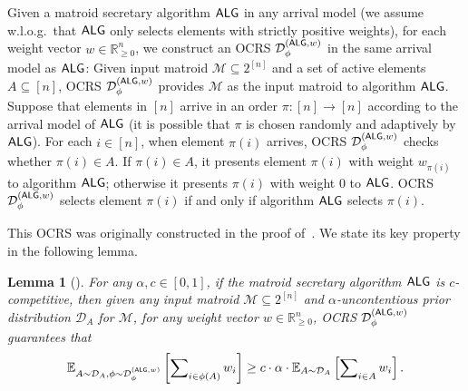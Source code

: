 \documentclass[11pt]{article}
\newcommand{\D}{\mathcal D}
\def \E {\mathbb{E}}
\newcommand{\M}{{\mathcal M}}
\newcommand{\alg}{\textnormal{\sffamily ALG}}
\newcommand{\R}{{\mathbb R}}
\newtheorem{lemma}[theorem]{Lemma}
\begin{document}
Given a matroid secretary algorithm $\alg$ in any arrival model (we assume w.l.o.g.~that $\alg$ only selects elements with strictly positive weights), for each weight vector $w\in\R_{\ge0}^{n}$, we construct an OCRS $\D_{\phi}^{(\alg,w)}$ in the same arrival model as $\alg$: Given input matroid $\M\subseteq2^{[n]}$ and a set of active elements $A\subseteq[n]$, OCRS $\D_{\phi}^{(\alg,w)}$ provides $\M$ as the input matroid to algorithm $\alg$. Suppose that elements in $[n]$ arrive in an order $\pi:[n]\to[n]$ according to the arrival model of $\alg$ (it is possible that $\pi$ is chosen randomly and adaptively by $\alg$). For each $i\in[n]$, when element $\pi(i)$ arrives, OCRS $\D_{\phi}^{(\alg,w)}$ checks whether $\pi(i)\in A$. If $\pi(i)\in A$, it presents element $\pi(i)$ with weight $w_{\pi(i)}$ to algorithm $\alg$; otherwise it presents $\pi(i)$ with weight $0$ to $\alg$. OCRS $\D_{\phi}^{(\alg,w)}$ selects element $\pi(i)$ if and only if algorithm $\alg$ selects $\pi(i)$.

This OCRS was originally constructed in the proof of~\citet[Theorem 4.1]{dughmi2020outer}. We state its key property in the following lemma.

\begin{lemma}[{\citet[Lemma 4.3]{dughmi2020outer}}]\label{lem:D_phi_A_w}
For any $\alpha,c\in[0,1]$, if the matroid secretary algorithm $\alg$ is $c$-competitive, then given any input matroid $\M\subseteq2^{[n]}$ and $\alpha$-uncontentious prior distribution $\D_A$ for $\M$, for any weight vector $w\in\R_{\ge0}^n$, OCRS $\D_{\phi}^{(\alg,w)}$ guarantees that 
\[
\E_{A\sim\D_A,\phi\sim\D_{\phi}^{(\alg,w)}}\left[\sum\nolimits_{i\in\phi(A)} w_i\right]\ge c\cdot\alpha\cdot\E_{A\sim\D_A}\left[\sum\nolimits_{i\in A} w_i\right].
\]
\end{lemma}
\end{document}
